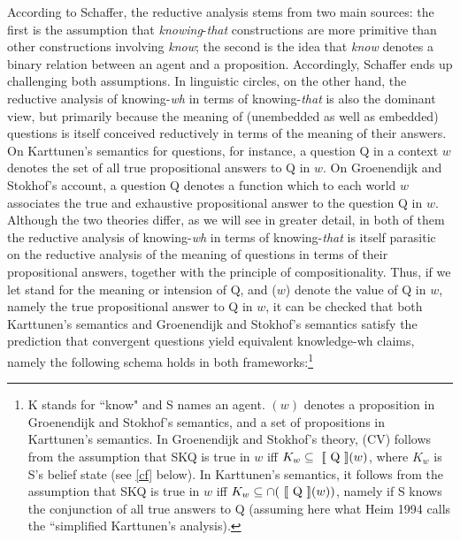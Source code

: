 According to Schaffer, the reductive analysis stems from two main
sources: the first is the assumption that
\emph{knowing}-\emph{that} constructions are more primitive than
other constructions involving \emph{know}; the second is the idea
that \emph{know} denotes a binary relation between an agent and a
proposition. Accordingly, Schaffer ends up challenging both
assumptions.
In linguistic circles, on the other hand, the reductive analysis
of knowing-\emph{wh} in terms of knowing-\emph{that} is also the
dominant view, but primarily because the meaning of (unembedded as
well as embedded) questions is itself conceived reductively in
terms of the meaning of their answers. On Karttunen's semantics
for questions, for instance, a question Q in a context $w$ denotes
the set of all true propositional answers to Q in $w$. On
Groenendijk and Stokhof's account, a question Q denotes a function
which to each world $w$ associates the true and exhaustive
propositional answer to the question Q in $w$. Although the two
theories differ, as we will see in greater detail, in both of them
the reductive analysis of knowing-\emph{wh} in terms of
knowing-\emph{that} is itself parasitic on the reductive analysis
of the meaning of questions in terms of their propositional
answers, together with the principle of compositionality. Thus, if
we let  stand for the meaning or intension of Q, and
($w$) denote the value of Q in $w$, namely the true
propositional answer to Q in $w$, it can be checked that both
Karttunen's semantics and Groenendijk and Stokhof's semantics
satisfy the prediction that convergent questions yield equivalent
knowledge-wh claims, namely the following schema holds in both
frameworks:\footnote{K stands for ``know" and S names an agent.
$(w)$ denotes a proposition in Groenendijk and Stokhof's
semantics, and a set of propositions in Karttunen's semantics. In
Groenendijk and Stokhof's theory, (CV) follows from the assumption
that SKQ is true in $w$ iff $K_w\subseteq \mbox{ $[\![$ Q $]\!]$}(w)$, where $K_w$
is S's belief state (see \ref{cf} below). In Karttunen's
semantics, it follows from the assumption that SKQ is true in $w$
iff $K_w\subseteq \cap(\mbox{ $[\![$ Q $]\!]$}(w))$, namely if S knows the
conjunction of all true answers to Q (assuming here what Heim 1994
calls the ``simplified Karttunen's analysis).}


